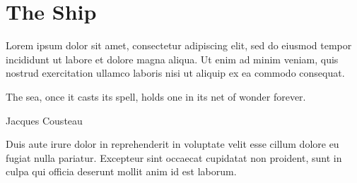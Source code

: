 \documentclass[11pt,oneside]{memoir}
\begin{document}
\section{The Ship}
Lorem ipsum dolor sit amet, consectetur adipiscing elit, sed do eiusmod tempor incididunt ut labore et dolore magna aliqua. Ut enim ad minim veniam, quis nostrud exercitation ullamco laboris nisi ut aliquip ex ea commodo consequat.

\epigraph{The sea, once it casts its spell, holds one in its net of wonder forever.}{Jacques Cousteau}

Duis aute irure dolor in reprehenderit in voluptate velit esse cillum dolore eu fugiat nulla pariatur. Excepteur sint occaecat cupidatat non proident, sunt in culpa qui officia deserunt mollit anim id est laborum.
\end{document}
